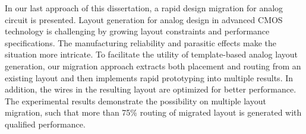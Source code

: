 In our last approach of this dissertation, a rapid design migration for analog circuit is presented. Layout generation for analog design in advanced CMOS technology is challenging by growing layout constraints and performance specifications. The manufacturing reliability and parasitic effects make the situation more intricate. To facilitate the utility of template-based analog layout generation, our migration approach extracts both placement and routing from an existing layout and then implements rapid prototyping into multiple results. In addition, the wires in the resulting layout are optimized for better performance. The experimental results demonstrate the possibility on multiple layout migration, such that more than 75\% routing of migrated layout is generated with qualified performance. 











